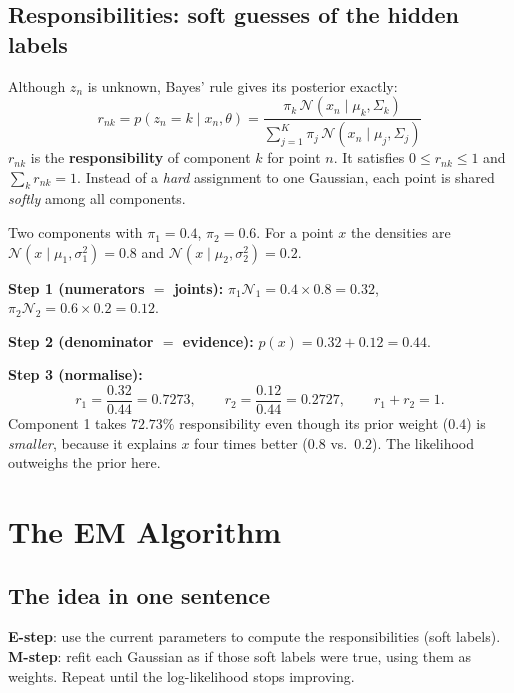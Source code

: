 \documentclass[11pt,a4paper]{article}
\newcommand{\N}{\mathcal{N}}
\begin{document}
\subsection{Responsibilities: soft guesses of the hidden labels}

Although $z_n$ is unknown, Bayes' rule gives its posterior exactly:
\[
\boxed{\;r_{nk}=p(z_n=k\mid x_n,\theta)=\frac{\pi_k\,\N(x_n\mid\mu_k,\Sigma_k)}{\sum_{j=1}^K\pi_j\,\N(x_n\mid\mu_j,\Sigma_j)}\;}
\]
$r_{nk}$ is the \textbf{responsibility} of component $k$ for point $n$. It satisfies $0\le r_{nk}\le1$ and $\sum_k r_{nk}=1$. Instead of a \emph{hard} assignment to one Gaussian, each point is shared \emph{softly} among all components.

\begin{example}
Two components with $\pi_1=0.4$, $\pi_2=0.6$. For a point $x$ the densities are $\N(x\mid\mu_1,\sigma_1^2)=0.8$ and $\N(x\mid\mu_2,\sigma_2^2)=0.2$.

\textbf{Step 1 (numerators $=$ joints):} $\pi_1\N_1=0.4\times0.8=0.32$, \quad $\pi_2\N_2=0.6\times0.2=0.12$.

\textbf{Step 2 (denominator $=$ evidence):} $p(x)=0.32+0.12=0.44$.

\textbf{Step 3 (normalise):}
\[
r_1=\frac{0.32}{0.44}=\mathbf{0.7273},\qquad r_2=\frac{0.12}{0.44}=\mathbf{0.2727},\qquad r_1+r_2=1.
\]
Component 1 takes $72.73\%$ responsibility even though its prior weight ($0.4$) is \emph{smaller}, because it explains $x$ four times better ($0.8$ vs.\ $0.2$). The likelihood outweighs the prior here.
\end{example}

\section{The EM Algorithm}

\subsection{The idea in one sentence}

\begin{keyidea}
\textbf{E-step}: use the current parameters to compute the responsibilities (soft labels). \textbf{M-step}: refit each Gaussian as if those soft labels were true, using them as weights. Repeat until the log-likelihood stops improving.
\end{keyidea}
\end{document}
